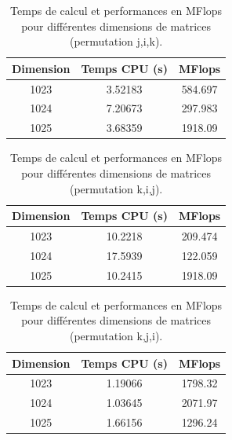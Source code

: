 \documentclass[a4paper,13pt]{book}
\begin{document}
\begin{table}[h!]
    \begin{center}
    \begin{tabular}{|c|c|c|}
        \hline
        Dimension & Temps CPU (s) & MFlops \\ \hline
        1023      & 3.52183       & 584.697 \\ \hline
        1024      & 7.20673       & 297.983 \\ \hline
        1025      & 3.68359       & 1918.09 \\ \hline
    \end{tabular}
    \caption{Temps de calcul et performances en MFlops pour différentes dimensions de matrices (permutation j,i,k).}
    \label{tab:perf_matrix_first_j,i,k}
\end{center}
\end{table}

\begin{table}[h!]
    \begin{center}
    \begin{tabular}{|c|c|c|}
        \hline
        Dimension & Temps CPU (s) & MFlops \\ \hline
        1023      & 10.2218       & 209.474 \\ \hline
        1024      & 17.5939       & 122.059 \\ \hline
        1025      & 10.2415       & 1918.09 \\ \hline
    \end{tabular}
    \caption{Temps de calcul et performances en MFlops pour différentes dimensions de matrices (permutation k,i,j).}
    \label{tab:perf_matrix_first_k,i,j}
\end{center}
\end{table}

\begin{table}[h!]
    \begin{center}
    \begin{tabular}{|c|c|c|}
        \hline
        Dimension & Temps CPU (s) & MFlops \\ \hline
        1023      &  1.19066       & 1798.32 \\ \hline
        1024      & 1.03645       & 2071.97 \\ \hline
        1025      & 1.66156       & 1296.24 \\ \hline
    \end{tabular}
    \caption{Temps de calcul et performances en MFlops pour différentes dimensions de matrices (permutation k,j,i).}
    \label{tab:perf_matrix_first_k,j,i}
\end{center}
\end{table}
\clearpage
\end{document}
